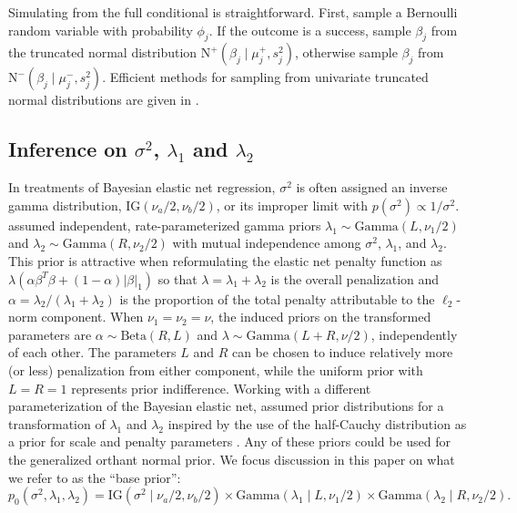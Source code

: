 \documentclass[12pt]{article}
\begin{document}
Simulating from the full conditional is straightforward. First, sample a Bernoulli random variable with
probability $\phi_j$. If the outcome is a success, sample $\beta_j$ from the truncated normal distribution
$\mbox{N}^+(\beta_j \mid \mu^+_j, s^2_j)$, otherwise sample $\beta_j$ from 
$\mbox{N}^-(\beta_j \mid \mu^-_j, s^2_j)$.  Efficient methods for sampling from univariate truncated
normal distributions are given in \citet{gewe:91}.


\subsection{Inference on $\sigma^2$, $\lambda_1$ and $\lambda_2$}\label{sec:fullbayes}
In treatments of Bayesian elastic net regression, $\sigma^2$ is often assigned an inverse gamma distribution, 
$\mbox{IG}(\nu_a/2, \nu_b/2)$, or its improper limit with $p(\sigma^2) \propto 1/\sigma^2$.
\citet{hans:11} assumed independent, rate-parameterized gamma priors $\lambda_1 \sim \mbox{Gamma}(L, \nu_1/2)$ 
and $\lambda_2 \sim \mbox{Gamma}(R, \nu_2/2)$ with mutual
independence among $\sigma^2$, $\lambda_1$, and $\lambda_2$. This prior is attractive when reformulating
the elastic net penalty function as $\lambda(\alpha \beta^T\beta + (1-\alpha)|\beta|_1)$ so that
$\lambda = \lambda_1 + \lambda_2$ is the overall penalization and $\alpha = \lambda_2/(\lambda_1 + \lambda_2)$
is the proportion of the total penalty attributable to the $\ell_2$-norm component. 
When $\nu_1 = \nu_2 = \nu$, the induced priors on the transformed parameters are
$\alpha \sim \mbox{Beta}(R,L)$ and $\lambda \sim \mbox{Gamma}(L+R, \nu/2)$,
independently of each other. The parameters $L$ and $R$ can be chosen to induce relatively more (or less)
penalization from either component, while the uniform prior with $L=R=1$ represents prior indifference.
Working with a different parameterization of the
Bayesian elastic net, \citet{wang:23} assumed prior distributions for a transformation of $\lambda_1$ and
$\lambda_2$ inspired by the use of the half-Cauchy distribution as a prior for scale \citep{gelm:06, pols:12b} 
and penalty parameters \citep{carv:10, bhad:17}. Any of these priors could be used for the generalized orthant
normal prior. We focus discussion in this paper on what we refer to as the ``base prior'':
\begin{equation}
	p_0(\sigma^2, \lambda_1, \lambda_2) = \mbox{IG}(\sigma^2 \mid \nu_a/2, \nu_b/2) \times
		\mbox{Gamma}(\lambda_1 \mid L, \nu_1/2) \times \mbox{Gamma}(\lambda_2 \mid R, \nu_2/2).
		\label{eq:base}
\end{equation}
\end{document}

